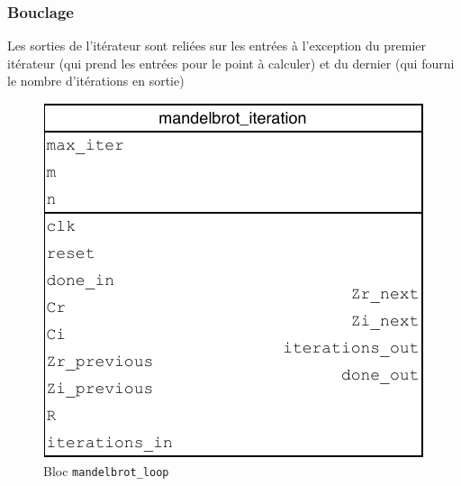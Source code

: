 \documentclass[LPSC_Labo03_SDeriaz]{subfiles}
\begin{document}
\subsubsection{Bouclage}
Les sorties de l'itérateur sont reliées sur les entrées à l'exception du premier itérateur (qui prend les entrées pour le point à calculer) et du dernier (qui fourni le nombre d'itérations en sortie)
\begin{figure}[H]
\centering
\includegraphics[scale=0.75,page=2]{../Documents/Schemas-crop.pdf}
\caption[caption]{Bloc \texttt{mandelbrot\_loop}}
\end{figure}
\end{document}
